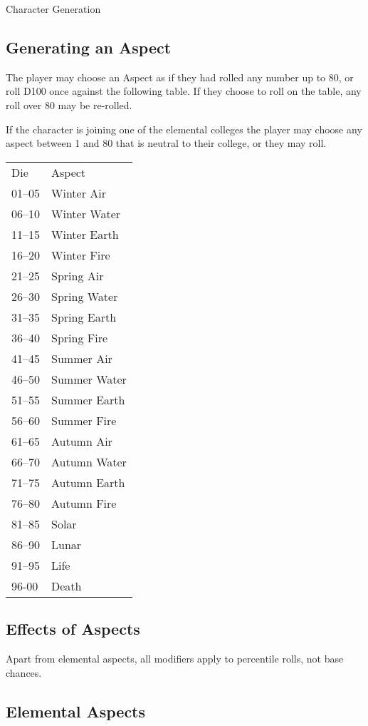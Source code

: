 \begin{Chapter}{Character Generation}
\subsection{Generating an Aspect}

The player may choose an Aspect as if they had rolled any number up to
80, or roll D100 once against the following table.  If they choose to
roll on the table, any roll over 80 may be re-rolled.

If the character is joining one of the elemental colleges the player
may choose any aspect between 1 and 80 that is neutral to their
college, or they may roll.

\begin{tabularx}{\columnwidth}{ll}
Die	& Aspect  \\
01–05	& Winter Air  \\
06–10	& Winter Water  \\
11–15	& Winter Earth  \\
16–20	& Winter Fire  \\
21–25	& Spring Air  \\
26–30	& Spring Water  \\
31–35	& Spring Earth  \\
36–40	& Spring Fire  \\
41–45	& Summer Air  \\
46–50	& Summer Water  \\
51–55	& Summer Earth  \\
56–60	& Summer Fire  \\
61–65	& Autumn Air  \\
66–70	& Autumn Water  \\
71–75	& Autumn Earth  \\
76–80	& Autumn Fire  \\
81–85	& Solar  \\
86–90	& Lunar  \\
91–95	& Life  \\
96-00	& Death  \\
\end{tabularx}

\subsection{Effects of Aspects}

Apart from elemental aspects, all modifiers apply to percentile rolls,
not base chances.

\subsection{Elemental Aspects}


\end{Chapter}
